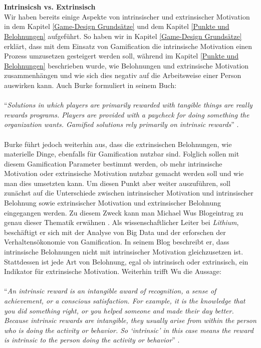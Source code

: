 \documentclass[a4paper,12pt,twoside]{scrartcl}
\begin{document}
\\\\
\textbf{Intrinsicsh vs. Extrinsisch}\\
Wir haben bereits einige Aspekte von intrinsischer und extrinsischer Motivation in dem Kapitel \ref{Game-Design Grundsätze} und dem Kapitel \ref{Punkte und Belohnungen} aufgeführt. So haben wir in Kapitel \ref{Game-Design Grundsätze} erklärt, dass mit dem Einsatz von Gamification die intrinsische Motivation einen Prozess umzusetzen gesteigert werden soll, während im Kapitel \ref{Punkte und Belohnungen} beschrieben wurde, wie Belohnungen und extrinsische Motivation zusammenhängen und wie sich dies negativ auf die Arbeitsweise einer Person auswirken kann. Auch Burke formuliert in seinem Buch:
\\\\
\enquote{\textit{Solutions in which players are primarily rewarded with tangible things are really rewards programs. Players are provided with a paycheck for doing something the organization wants. Gamified solutions rely primarily on intrinsic rewards}} \cite{gamificationDefinition}.
\\\\
Burke führt jedoch weiterhin aus, dass die extrinsischen Belohnungen, wie materielle Dinge, ebenfalls für Gamification nutzbar sind. Folglich sollen mit diesem Gamification Parameter bestimmt werden, ob mehr intrinsische Motivation oder extrinsische Motivation nutzbar gemacht werden soll und wie man dies umsetzten kann. Um diesen Punkt aber weiter auszuführen, soll zunächst auf die Unterschiede zwischen intrinsischer Motivation und intrinsischer Belohnung sowie extrinsischer Motivation und extrinsischer Belohnung eingegangen werden. Zu diesem Zweck kann man Michael Wus Blogeintrag zu genau dieser Thematik erwähnen \cite{Wu14}. Als wissenschaftlicher Leiter bei \textit{Lithium}, beschäftigt er sich mit der Analyse von Big Data und der erforschen der Verhaltensökonomie von Gamification. In seinem Blog beschreibt er, dass intrinsische Belohnungen nicht mit intrinsischer Motivation gleichzusetzen ist. Stattdessen ist jede Art von Belohnung, egal ob intrinsisch oder extrinsisch, ein Indikator für extrinsische Motivation. Weiterhin trifft Wu die Aussage:
\\\\
\enquote{\textit{An intrinsic reward is an intangible award of recognition, a sense of achievement, or a conscious satisfaction. For example, it is the knowledge that you did something right, or you helped someone and made their day better. Because intrinsic rewards are intangible, they usually arise from within the person who is doing the activity or behavior. So \enquote{intrinsic} in this case means the reward is intrinsic to the person doing the activity or behavior}} \cite{Wu14}.
\end{document}
